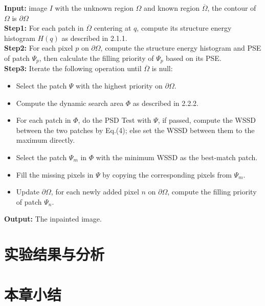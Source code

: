 \textbf{Input:} image \(I\) with the unknown region \(\Omega \) and known region \(\overline{\Omega}\), the contour of \(\Omega \) is \(\partial \Omega\)\\
\textbf{Step1:} For each patch in \(\overline{\Omega}\) centering at \(q\), compute its structure energy histogram \(H(q)\) as described in 2.1.1.\\
\textbf{Step2:} For each pixel \(p\) on \(\partial \Omega\), compute the structure energy histogram and PSE of patch \(\Psi_p\), then calculate the filling priority of \(\Psi_p\) based on its PSE.\\
\textbf{Step3:} Iterate the following operation until \(\overline{\Omega}\) is null:
\begin{itemize}
    \item Select the patch \(\Psi\) with the highest priority on \(\partial \Omega\).
    \item Compute the dynamic search area \(\Phi\) as described in 2.2.2.
    \item For each patch in \(\Phi\), do the PSD Test with \(\Psi\), if passed, compute the WSSD between the two patches by Eq.(4); else set the WSSD between them to the maximum directly.
    \item Select the patch \(\Psi_m \) in \(\Phi\) with the minimum WSSD as the best-match patch.
    \item Fill the missing pixels in \(\Psi\) by copying the corresponding pixels from \(\Psi_m\).
    \item Update \(\partial \Omega\), for each newly added pixel \(n\) on \(\partial \Omega\), compute the filling priority of patch \(\Psi_n\).
  \end{itemize}
\textbf{Output:} The inpainted image.


\section{实验结果与分析}
\label{results}


\section{本章小结}
\label{conclusions}





